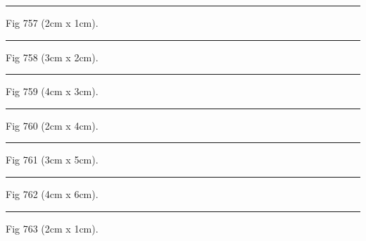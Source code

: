 \documentclass[a4paper,11pt]{article}
\begin{document}
\begin{swarmwrap}%
  \begin{minipage}[t]{2cm}
    \centering
    \rule{\linewidth}{1cm}
    {\footnotesize Fig 757 (2cm x 1cm).}
  \end{minipage}%
\end{swarmwrap}%
\swarmwrapnext
\lipsum[7]%

\begin{swarmwrap}%
  \begin{minipage}[t]{3cm}
    \centering
    \rule{\linewidth}{2cm}
    {\footnotesize Fig 758 (3cm x 2cm).}
  \end{minipage}%
\end{swarmwrap}%
\swarmwrapnext
\lipsum[8]%

\begin{swarmwrap}%
  \begin{minipage}[t]{4cm}
    \centering
    \rule{\linewidth}{3cm}
    {\footnotesize Fig 759 (4cm x 3cm).}
  \end{minipage}%
\end{swarmwrap}%
\swarmwrapnext
\lipsum[9]%

\begin{swarmwrap}%
  \begin{minipage}[t]{2cm}
    \centering
    \rule{\linewidth}{4cm}
    {\footnotesize Fig 760 (2cm x 4cm).}
  \end{minipage}%
\end{swarmwrap}%
\swarmwrapnext
\lipsum[10]%

\begin{swarmwrap}%
  \begin{minipage}[t]{3cm}
    \centering
    \rule{\linewidth}{5cm}
    {\footnotesize Fig 761 (3cm x 5cm).}
  \end{minipage}%
\end{swarmwrap}%
\swarmwrapnext
\lipsum[11]%

\begin{swarmwrap}%
  \begin{minipage}[t]{4cm}
    \centering
    \rule{\linewidth}{6cm}
    {\footnotesize Fig 762 (4cm x 6cm).}
  \end{minipage}%
\end{swarmwrap}%
\swarmwrapnext
\lipsum[12]%

\begin{swarmwrap}%
  \begin{minipage}[t]{2cm}
    \centering
    \rule{\linewidth}{1cm}
    {\footnotesize Fig 763 (2cm x 1cm).}
  \end{minipage}%
\end{swarmwrap}%
\swarmwrapnext
\lipsum[13]%
\end{document}
